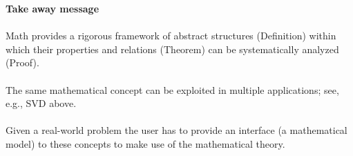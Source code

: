 \begin{frame}[c]
\begin{center}
		 \begin{minipage}{0.8\textwidth}
		 \textbf{\Large Take away message}\\~\\
	 	Math provides a rigorous framework of abstract structures (Definition) within which their properties and relations (Theorem) can be systematically analyzed (Proof).
	 	~\\~\\
	 	The same mathematical concept can be exploited in multiple applications; see, e.g., SVD above.
	 	~\\~\\
	 	Given a real-world problem the user has to provide an interface (a mathematical model) to these  concepts to make use of the mathematical theory.
	 \end{minipage}
\end{center}
\end{frame}